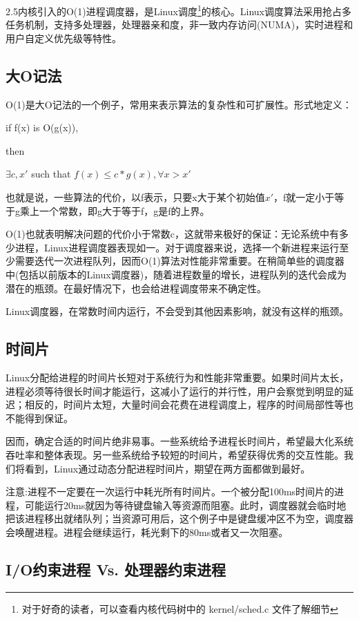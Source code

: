 2.5内核引入的O(1)进程调度器，是Linux调度\footnote[1]{对于好奇的读者，可以查看内核代码树中的 kernel/sched.c 文件了解细节}的核心。Linux调度算法采用抢占多任务机制，支持多处理器，处理器亲和度，非一致内存访问(NUMA)，实时进程和用户自定义优先级等特性。

\subsection{大O记法}
O(1)是大O记法的一个例子，常用来表示算法的复杂性和可扩展性。形式地定义：
\begin{center}
  if f(x) is O(g(x)),

  then

  $\exists c,x'$ such that $f(x) \le c * g(x), \forall x > x'$
\end{center}

也就是说，一些算法的代价，以f表示，只要x大于某个初始值$x'$，f就一定小于等于g乘上一个常数，即g大于等于f，g是f的上界。

O(1)也就表明解决问题的代价小于常数c，这就带来极好的保证：无论系统中有多少进程，Linux进程调度器表现如一。对于调度器来说，选择一个新进程来运行至少需要迭代一次进程队列，因而O(1)算法对性能非常重要。在稍简单些的调度器中(包括以前版本的Linux调度器)，随着进程数量的增长，进程队列的迭代会成为潜在的瓶颈。在最好情况下，也会给进程调度带来不确定性。

Linux调度器，在常数时间内运行，不会受到其他因素影响，就没有这样的瓶颈。

\subsection{时间片}

Linux分配给进程的时间片长短对于系统行为和性能非常重要。如果时间片太长，进程必须等待很长时间才能运行，这减小了运行的并行性，用户会察觉到明显的延迟；相反的，时间片太短，大量时间会花费在进程调度上，程序的时间局部性等也不能得到保证。

因而，确定合适的时间片绝非易事。一些系统给予进程长时间片，希望最大化系统吞吐率和整体表现。另一些系统给予较短的时间片，希望获得优秀的交互性能。我们将看到，Linux通过动态分配进程时间片，期望在两方面都做到最好。

注意:进程不一定要在一次运行中耗光所有时间片。一个被分配100ms时间片的进程，可能运行20ms就因为等待键盘输入等资源而阻塞。此时，调度器就会临时地把该进程移出就绪队列；当资源可用后，这个例子中是键盘缓冲区不为空，调度器会唤醒进程。进程会继续运行，耗光剩下的80ms或者又一次阻塞。

\subsection{I/O约束进程 Vs. 处理器约束进程}

